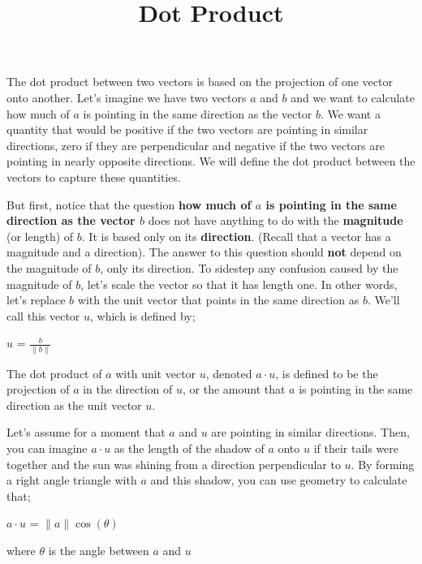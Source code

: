 \documentclass[12pt]{article}
\title{Dot Product}
\date{}
\begin{document}
    \maketitle

The dot product between two vectors is based on the projection of one vector onto another. Let's imagine we have two vectors $a$ and $b$ and we want to calculate how much of $a$ is pointing in the same direction as the vector $b$. We want a quantity that would be positive if the two vectors are pointing in similar directions, zero if they are perpendicular and negative if the two vectors are pointing in nearly opposite directions. We will define the dot product between the vectors to capture these quantities.

But first, notice that the question \textbf{how much of $a$ is pointing in the same direction as the vector $b$} does not have anything to do with the \textbf{magnitude} (or length) of $b$. It is based only on its \textbf{direction}. (Recall that a vector has a magnitude and a direction). The answer to this question should \textbf{not} depend on the magnitude of $b$, only its direction. To sidestep any confusion caused by the magnitude of $b$, let's scale the vector so that it has length one. In other words, let's replace $b$ with the unit vector that points in the same direction as $b$. We'll call this vector $u$, which is defined by;

\begin{center}
    $u$ = $\frac{b}{\| b \|}$
\end{center}

The dot product of $a$ with unit vector $u$, denoted $a \cdot u$, is defined to be the projection of $a$ in the direction of $u$, or the amount that $a$ is pointing in the same direction as the unit vector $u$.

Let's assume for a moment that $a$ and $u$ are pointing in similar directions. Then, you can imagine $a \cdot u$ as the length of the shadow of $a$ onto $u$ if their tails were together and the sun was shining from a direction perpendicular to $u$. By forming a right angle triangle with $a$ and this shadow, you can use geometry to calculate that;

\begin{center}
    $a \cdot u$ = $\|a\| \cos(\theta)$
\end{center}

where $\theta$ is the angle between $a$ and $u$

\end{document}
